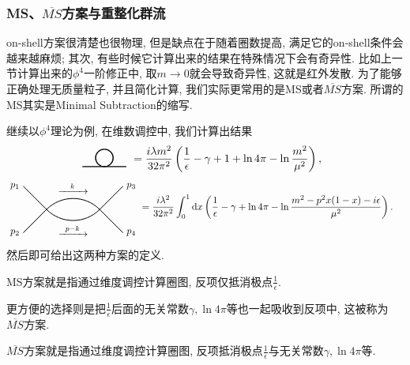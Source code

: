 \subsubsection{MS、$\overline{MS}$方案与重整化群流}
on-shell方案很清楚也很物理, 但是缺点在于随着圈数提高, 满足它的on-shell条件会越来越麻烦; 其次, 有些时候它计算出来的结果在特殊情况下会有奇异性. 比如上一节计算出来的$\phi^4$一阶修正中, 取$m\to0$就会导致奇异性, 这就是红外发散. 为了能够正确处理无质量粒子, 并且简化计算, 我们实际更常用的是MS或者$\overline{MS}$方案. 所谓的MS其实是Minimal Subtraction的缩写.

继续以$\phi^4$理论为例, 在维数调控中, 我们计算出结果
\begin{align}
    \vcenter{\hbox{
        \begin{tikzpicture}[line width=1pt, scale=0.7, baseline=-0.1cm]
            \draw (-1,0) -- (1,0);
            \draw (0,0.4) circle (0.4);
        \end{tikzpicture}
    }}&=\frac{i\lambda m^2}{32\pi^2}\left(\frac1\epsilon-\gamma+1+\ln4\pi-\ln\frac{m^2}{\mu^2}\right),\notag
\end{align}
\begin{align}
    \begin{tikzpicture}[baseline=(current bounding box.center), scale=1.2]
        \coordinate (v1) at (-0.8,0);
        \coordinate (v2) at (0.8,0);
        \draw[thick] (-1.5, 0.7) -- (v1) node[pos=0, left] {$p_1$};
        \draw[thick] (-1.5,-0.7) -- (v1) node[pos=0, left] {$p_2$};
        \draw[thick] (v2) -- (1.5, 0.7) node[pos=1, right] {$p_3$};
        \draw[thick] (v2) -- (1.5,-0.7) node[pos=1, right] {$p_4$};
        \draw[thick] (v1) to[out=45,in=135] node[inner sep=0.5pt, label=above:$\xrightarrow{\quad k \quad}$] {} (v2);
        \draw[thick] (v1) to[out=-45,in=-135] node[inner sep=0.5pt, label=below:$\xrightarrow{\;\; p-k \;\;}$] {} (v2);
    \end{tikzpicture}
    &=\frac{i\lambda^2}{32\pi^2}\int_0^1\dx\left(\frac1\epsilon-\gamma+\ln4\pi-\ln\frac{m^2-p^2x(1-x)-i\epsilon}{\mu^2}\right).\notag
\end{align}
然后即可给出这两种方案的定义.
\begin{definition}[MS方案]
    MS方案就是指通过维度调控计算圈图, 反项仅抵消极点$\frac1\epsilon$.
\end{definition}
更方便的选择则是把$\frac1\epsilon$后面的无关常数$\gamma, \ln4\pi$等也一起吸收到反项中, 这被称为$\overline{MS}$方案.
\begin{definition}[$\overline{MS}$方案]
    $\overline{MS}$方案就是指通过维度调控计算圈图, 反项抵消极点$\frac1\epsilon$与无关常数$\gamma, \ln4\pi$等.
\end{definition}


